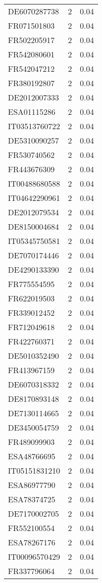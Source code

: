 \begin{table*}[htbp]
\begin{tabular}{lrr}
DE6070287738 & 2 & 0.04 \\
FR071501803 & 2 & 0.04 \\
FR502205917 & 2 & 0.04 \\
FR542080601 & 2 & 0.04 \\
FR542047212 & 2 & 0.04 \\
FR380192807 & 2 & 0.04 \\
DE2012007333 & 2 & 0.04 \\
ESA01115286 & 2 & 0.04 \\
IT03513760722 & 2 & 0.04 \\
DE5310090257 & 2 & 0.04 \\
FR530740562 & 2 & 0.04 \\
FR443676309 & 2 & 0.04 \\
IT00488680588 & 2 & 0.04 \\
IT04642290961 & 2 & 0.04 \\
DE2012079534 & 2 & 0.04 \\
DE8150004684 & 2 & 0.04 \\
IT05345750581 & 2 & 0.04 \\
DE7070174446 & 2 & 0.04 \\
DE4290133390 & 2 & 0.04 \\
FR775554595 & 2 & 0.04 \\
FR622019503 & 2 & 0.04 \\
FR339012452 & 2 & 0.04 \\
FR712049618 & 2 & 0.04 \\
FR422760371 & 2 & 0.04 \\
DE5010352490 & 2 & 0.04 \\
FR413967159 & 2 & 0.04 \\
DE6070318332 & 2 & 0.04 \\
DE8170893148 & 2 & 0.04 \\
DE7130114665 & 2 & 0.04 \\
DE3450054759 & 2 & 0.04 \\
FR489099903 & 2 & 0.04 \\
ESA48766695 & 2 & 0.04 \\
IT05151831210 & 2 & 0.04 \\
ESA86977790 & 2 & 0.04 \\
ESA78374725 & 2 & 0.04 \\
DE7170002705 & 2 & 0.04 \\
FR552100554 & 2 & 0.04 \\
ESA78267176 & 2 & 0.04 \\
IT00096570429 & 2 & 0.04 \\
FR337796064 & 2 & 0.04 \\

\end{tabular}
\end{table*}
